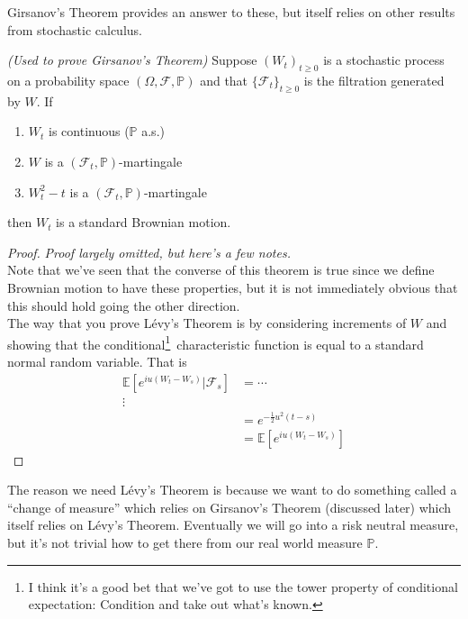 \documentclass[12pt]{article}
\newenvironment{theorem}[2][Theorem:]{\begin{trivlist} %
\item[\hskip \labelsep {\bfseries #1}\hskip \labelsep {\bfseries #2.}]}{\end{trivlist}}
\newlength\tindent
\renewcommand{\indent}{\hspace*{\tindent}}
\begin{document}
\indent Girsanov's Theorem provides an answer to these, but itself relies on other results from stochastic calculus.

\begin{theorem}{L\'{e}vy's Theorem} {\em (Used to prove Girsanov's Theorem)} Suppose $(W_t)_{t\geq0}$ is a stochastic process on a probability space $(\Omega,\mathcal F,\mathbb P)$ and that $\{\mathcal F_t\}_{t\geq0}$ is the filtration generated by $W$. If
\begin{enumerate} 
	\item $W_t$ is continuous ($\mathbb P$ a.s.)
	\item $W$ is a $(\mathcal F_t,\mathbb P)$-martingale
	\item $W_t^2 - t$ is a $(\mathcal F_t,\mathbb P)$-martingale
\end{enumerate}

then $W_t$ is a standard Brownian motion.

\begin{proof} {\em Proof largely omitted, but here's a few notes.} \\

\indent Note that we've seen that the converse of this theorem is true since we define Brownian motion to have these properties, but it is not immediately obvious that this should hold going the other direction. \\

\indent The way that you prove L\'{e}vy's Theorem is by considering increments of $W$ and showing that the conditional\footnote{I think it's a good bet that we've got to use the tower property of conditional expectation: Condition and take out what's known.}~characteristic function is equal to a standard normal random variable. That is
\begin{align*}
	\mathbb E[e^{iu(W_t - W_s)}|\mathcal F_s] &= \cdots \\
	\vdots \\
	&= e^{-\frac{1}{2}u^2(t-s)} \\
	&= \mathbb E[e^{iu(W_t - W_s)}]
\end{align*}
\end{proof}
\end{theorem}

\indent The reason we need L\'{e}vy's Theorem is because we want to do something called a ``change of measure'' which relies on Girsanov's Theorem (discussed later) which itself relies on L\'{e}vy's Theorem. Eventually we will go into a risk neutral measure, but it's not trivial how to get there from our real world measure $\mathbb P$. \\
\end{document}
